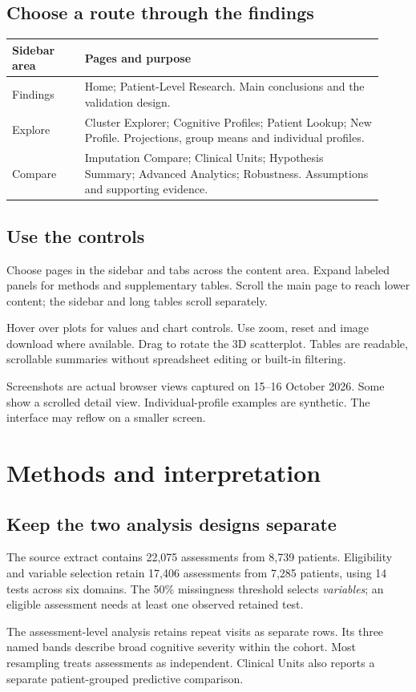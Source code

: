\documentclass[11pt,a4paper]{article}
\newcommand{\note}[1]{\par\smallskip\colorbox{pale}{\parbox{\dimexpr\linewidth-2\fboxsep\relax}{\vspace{0.4em}#1\vspace{0.4em}}}\par\smallskip}
\newcommand{\page}[1]{\clearpage\section{#1}}
\begin{document}
\subsection*{Choose a route through the findings}
\begin{tabular}{p{0.18\linewidth}p{0.74\linewidth}}
\toprule
\textbf{Sidebar area} & \textbf{Pages and purpose}\\
\midrule
Findings & Home; Patient-Level Research. Main conclusions and the validation design.\\[0.5em]
Explore & Cluster Explorer; Cognitive Profiles; Patient Lookup; New Profile. Projections, group means and individual profiles.\\[0.5em]
Compare & Imputation Compare; Clinical Units; Hypothesis Summary; Advanced Analytics; Robustness. Assumptions and supporting evidence.\\
\bottomrule
\end{tabular}

\subsection*{Use the controls}
Choose pages in the sidebar and tabs across the content area. Expand labeled panels for methods and supplementary tables. Scroll the main page to reach lower content; the sidebar and long tables scroll separately.

Hover over plots for values and chart controls. Use zoom, reset and image download where available. Drag to rotate the 3D scatterplot. Tables are readable, scrollable summaries without spreadsheet editing or built-in filtering.

\note{Screenshots are actual browser views captured on 15--16 October 2026. Some show a scrolled detail view. Individual-profile examples are synthetic. The interface may reflow on a smaller screen.}

\page{Methods and interpretation}
\subsection*{Keep the two analysis designs separate}
The source extract contains 22,075 assessments from 8,739 patients. Eligibility and variable selection retain 17,406 assessments from 7,285 patients, using 14 tests across six domains. The 50\% missingness threshold selects \emph{variables}; an eligible assessment needs at least one observed retained test.

The assessment-level analysis retains repeat visits as separate rows. Its three named bands describe broad cognitive severity within the cohort. Most resampling treats assessments as independent. Clinical Units also reports a separate patient-grouped predictive comparison.
\end{document}
